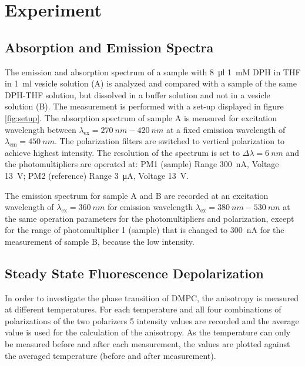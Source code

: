 \documentclass{scrartcl}
\numberwithin{equation}{section}
\numberwithin{figure}{section}
\numberwithin{table}{section}
\begin{document}
\section{Experiment}
\subsection{Absorption and Emission Spectra}
The emission and absorption spectrum of a sample with \SI{8}{\micro l} \SI{1}{mM} DPH in THF in \SI{1}{ml} vesicle solution (A) is analyzed and compared with a sample of the same DPH-THF solution, but dissolved in a buffer solution and not in a vesicle solution (B). The measurement is performed with a set-up displayed in figure \ref{fig:setup}. The absorption spectrum of sample A is measured for excitation wavelength between $\lambda_\text{ex}=\SI{270}{nm} - \SI{420}{nm}$ at a fixed emission wavelength of $\lambda_\text{em}=\SI{450}{nm}$. The polarization filters are switched to vertical polarization to achieve highest intensity. The resolution of the spectrum is set to $\Delta \lambda =\SI{6}{nm}$ and the photomultipliers  are operated at: PM1 (sample) Range \SI{300}{nA}, Voltage \SI{13}{V}; PM2 (reference) Range \SI{3}{\micro A}, Voltage \SI{13}{V}.

The emission spectrum for sample A and B are recorded at an excitation wavelength of $\lambda_\text{ex}=\SI{360}{nm}$ for emission wavelength $\lambda_\text{ex}=\SI{380}{nm} - \SI{530}{nm}$ at the same operation parameters for the photomultipliers and polarization, except for the range of photomultiplier 1 (sample) that is changed to \SI{300}{nA} for the measurement of sample B, because the low intensity.

\subsection{Steady State Fluorescence Depolarization}
In order to investigate the phase transition of DMPC, the anisotropy is measured at different temperatures. For each temperature and all four combinations of polarizations of the two polarizers 5 intensity values are recorded and the average value is used for the calculation of the anisotropy. As the temperature can only be measured before and after each measurement, the  values are plotted against the averaged temperature (before and after measurement).
\end{document}
